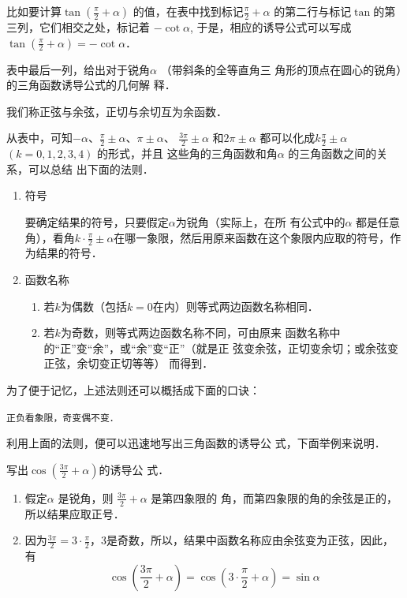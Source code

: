 比如要计算$\tan\left(\frac{\pi}{2}+\alpha\right)$
的值，在表中找到标记$\frac{\pi}{2}+\alpha$
的第二行与标记$\tan$的第三列，它们相交之处，标记着
$-\cot\alpha$, 于是，相应的诱导公式可以写成
$\tan \left(\frac{\pi}{2}+\alpha\right) =
-\cot\alpha$．

表中最后一列，给出对于锐角$\alpha$ （带斜条的全等直角三
角形的顶点在圆心的锐角）的三角函数诱导公式的几何解
释．

我们称正弦与余弦，正切与余切互为余函数．

从表中，可知$-\alpha$、$\frac{\pi}{2}\pm\alpha$、$\pi \pm\alpha$、
$\frac{3\pi}{2}\pm \alpha$ 和$2\pi \pm\alpha$ 都可以化成$k\frac{\pi}{2}
\pm\alpha$ $(k=0,1,2,3,4)$ 的形式，并且
这些角的三角函数和角$\alpha$ 的三角函数之间的关系，可以总结
出下面的法则．

\begin{enumerate}
    \item 符号
    
要确定结果的符号，只要假定$\alpha$为锐角（实际上，在所
有公式中的$\alpha$ 都是任意角），看角$k\cdot \frac{\pi}{2}\pm \alpha$在哪一象限，然后用原来函数在这个象限内应取的符号，作为结果的符号．

\item 函数名称
\begin{enumerate}
    \item 若$k$为偶数（包括$k=0$在内）则等式两边函数名称相同．
    \item 若$k$为奇数，则等式两边函数名称不同，可由原来
函数名称中的“正”变“余”，或“余”变“正”（就是正
弦变余弦，正切变余切；或余弦变正弦，余切变正切等等）
而得到．
\end{enumerate}
\end{enumerate}

为了便于记忆，上述法则还可以概括成下面的口诀：
\begin{center}
\verb|正负看象限，奇变偶不变． |
\end{center}

利用上面的法则，便可以迅速地写出三角函数的诱导公
式，下面举例来说明．

\begin{example}
    写出$\cos\left(\frac{3\pi}{2}+\alpha\right)$的诱导公
    式．
\end{example}

\begin{solution}
\begin{enumerate}
    \item 假定$\alpha$ 是锐角，则
$\frac{3\pi}{2}+\alpha$ 是第四象限的
角，而第四象限的角的余弦是正的，所以结果应取正号．
\item 因为$\frac{3\pi}{2}=3\cdot \frac{\pi}{2}$，3是奇数，所以，结果中函数名称应由余弦变为正弦，因此，有
\[\cos\left(\frac{3\pi}{2}+\alpha\right)=\cos\left(3\cdot \frac{\pi}{2}+\alpha\right)=\sin\alpha\]
\end{enumerate}
\end{solution}

